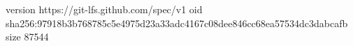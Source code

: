 version https://git-lfs.github.com/spec/v1
oid sha256:97918b3b768785c5e4975d23a33adc4167c08dee846cc68ea57534dc3dabcafb
size 87544
